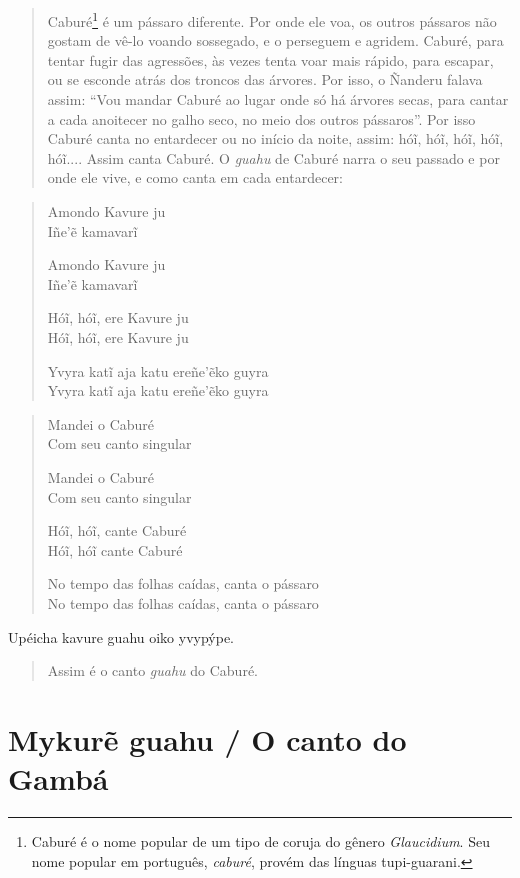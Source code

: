 \begin{quote}
Caburé\footnote{Caburé é o nome popular de um tipo de coruja do gênero
  \emph{Glaucidium}. Seu nome popular em português, \emph{caburé},
  provém das línguas tupi-guarani.} é um pássaro diferente. Por onde ele
voa, os outros pássaros não gostam de vê-lo voando sossegado, e o
perseguem e agridem. Caburé, para tentar fugir das agressões, às vezes
tenta voar mais rápido, para escapar, ou se esconde atrás dos troncos
das árvores. Por isso, o Ñanderu falava assim: ``Vou mandar Caburé ao
lugar onde só há árvores secas, para cantar a cada anoitecer no galho
seco, no meio dos outros pássaros''. Por isso Caburé canta no entardecer
ou no início da noite, assim: hóĩ, hóĩ, hóĩ, hóĩ, hóĩ.... Assim canta
Caburé. O \emph{guahu} de Caburé narra o seu passado e por onde ele
vive, e como canta em cada entardecer:
\end{quote}

\begin{verse}
Amondo Kavure ju\\
Iñe'ẽ kamavarĩ

Amondo Kavure ju\\
Iñe'ẽ kamavarĩ

Hóĩ, hóĩ, ere Kavure ju\\
Hóĩ, hóĩ, ere Kavure ju

Yvyra katĩ aja katu ereñe'ẽko guyra\\
Yvyra katĩ aja katu ereñe'ẽko guyra
\end{verse}

\begin{verse}
Mandei o Caburé\\
Com seu canto singular

Mandei o Caburé\\
Com seu canto singular

Hóĩ, hóĩ, cante Caburé\\
Hóĩ, hóĩ cante Caburé

No tempo das folhas caídas, canta o pássaro\\
No tempo das folhas caídas, canta o pássaro
\end{verse}

Upéicha kavure guahu oiko yvypýpe.

\begin{quote}
Assim é o canto \emph{guahu} do Caburé.
\end{quote}

\chapter{Mykurẽ guahu / O canto do Gambá}

